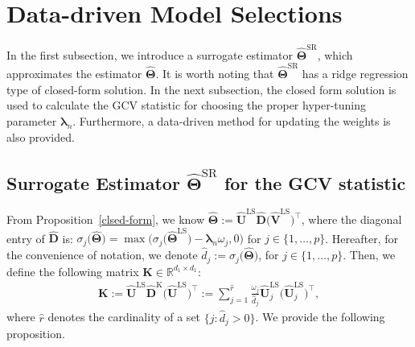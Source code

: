 \documentclass[alpha-refs]{wiley-article}
\begin{document}
\section{Data-driven Model Selections} \label{parameter_selection}
In the first subsection, we introduce a surrogate estimator $\widehat{\boldsymbol{\Theta}}^{\text{SR}}$, which approximates the estimator $\widehat{\boldsymbol{\Theta}}$.
It is worth noting that $\widehat{\boldsymbol{\Theta}}^{\text{SR}}$ has a ridge regression type of closed-form solution.
In the next subsection, the closed form solution is used to calculate the GCV statistic for choosing the proper hyper-tuning parameter  $\boldsymbol{\lambda}_{n}$.
Furthermore, a data-driven method for updating the weights is also provided.

\subsection{Surrogate Estimator $\widehat{\boldsymbol{\Theta}}^{\text{SR}}$ for the GCV statistic}
From Proposition~\ref{clsed-form}, we know $\widehat{\boldsymbol{\Theta}} := \widehat{\boldsymbol{U}}^{\text{LS}}\widehat{\boldsymbol{D}}\big(\widehat{\boldsymbol{V}}^{\text{LS}}\big)^{\top}$,
where the diagonal entry of $\widehat{\boldsymbol{D}}$ is: $\sigma_{j}\big(\widehat{\boldsymbol{\Theta}}\big) = \max \big(  \sigma_{j}\big(\widehat{\boldsymbol{\Theta}}^{\text{LS}}\big)-\boldsymbol{\lambda}_{n} \omega_{j},0 \big)$ for $j\in\{1,\dots,p\}$.
Hereafter, for the convenience of notation, we denote $\widehat{d}_{j}:=\sigma_{j}\big(\widehat{\boldsymbol{\Theta}}\big)$, for $j\in\{1,\dots,p\}$.
Then, we define the following matrix $\boldsymbol{K}\in\mathbb{R}^{d_{1}\times d_{1}}$:
\begin{align} \label{K}
    \boldsymbol{K}
    :=  \widehat{\boldsymbol{U}}^{\text{LS}} \widehat{\boldsymbol{D}}^{\text{K}} \big(\widehat{\boldsymbol{U}}^{\text{LS}} \big)^{\top}
    :=\sum_{j=1}^{\widehat{r}}
    \frac{\omega_{j}}{\widehat{d}_{j}}
    \widehat{\boldsymbol{U}}_{j}^{\text{LS}} \big(\widehat{\boldsymbol{U}}_{j}^{\text{LS}}\big)^{\top},
\end{align}
where $\widehat{r}$ denotes the cardinality of a set $\{j : \widehat{d}_{j}>0 \}$.
We provide the following proposition.
\end{document}
